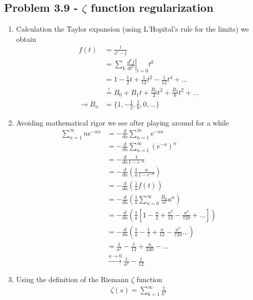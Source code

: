 \documentclass[10pt,a4paper]{book}
\theoremstyle{definition}
\begin{document}
\subsection{Problem 3.9 - \texorpdfstring{$\zeta$}{TEXT} function regularization}
\begin{enumerate}
    \item Calculation the Taylor expansion (using L'Hopital's rule for the limits) we obtain
    \begin{align}
        f(t)
        &=\frac{t}{e^t-1}\\
        &=\sum_k\left.\frac{d^kf}{dt^k}\right|_{t=0}t^k\\
        &=1-\frac{1}{2}t+\frac{1}{12}t^2-\frac{1}{12}t^4+...\\
        &\stackrel{!}{=}B_0+B_1t+\frac{B_2}{2}t^2+\frac{B_3}{6}t^2+...\\
        \rightarrow B_n&=\{1,-\frac{1}{2},\frac{1}{6},0,...\}
    \end{align}
    \item Avoiding mathematical rigor we see after playing around for a while
    \begin{align}
        \sum_{n=1}^\infty ne^{-an}
        &=-\frac{d}{da}\sum_{n=1}^\infty e^{-an}\\
        &=-\frac{d}{da}\sum_{n=1}^\infty \left(e^{-a}\right)^n\\
        &=-\frac{d}{da}\frac{1}{1-e^{-a}}\\
        &=-\frac{d}{da}\left(\frac{1}{a}\frac{a}{1-e^{-a}}\right)\\
        &=-\frac{d}{da}\left(\frac{1}{a}f(t)\right)\\
        &=-\frac{d}{da}\left(\frac{1}{a}\sum_{n=0}^\infty\frac{B_n}{n!}a^n\right)\\
        &=-\frac{d}{da}\left(\frac{1}{a}\left[1-\frac{a}{2}+\frac{a^2}{12}-\frac{a^4}{720}+...\right]\right)\\
        &=-\frac{d}{da}\left(\frac{1}{a}-\frac{1}{2}+\frac{a}{12}-\frac{a^3}{720}...\right)\\
        &=\frac{1}{a^2}-\frac{1}{12}+\frac{a}{240}-...\\
        &\stackrel{a\rightarrow0}{\rightarrow}\frac{1}{a^2}-\frac{1}{12}
    \end{align}
    \item Using the definition of the Riemann $\zeta$ function 
    \begin{align}
        \zeta(s)=\sum_{k=1}^\infty \frac{1}{k^s}
    \end{align}
\end{enumerate}
\end{document}
